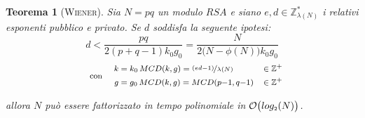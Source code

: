 \documentclass[twoside,symmetric,justified,openany,nobib]{tufte-book}
\def\P#1{_{\text{\tiny $#1$}}}
\newtheorem{thm}{Teorema}
\begin{document}
\begin{thm}[\textsc{Wiener}]
  \label{th-wiener}
  Sia $N{=}pq$ un modulo $RSA$ e siano $e,d{\in}\mathbb{Z}^*_{\lambda(N)}$ i relativi esponenti pubblico e privato. Se $d$ soddisfa la seguente ipotesi:
  \begin{equation}
    \label{ip_wiener}
    d < \frac{pq}{2(p{+}q{-}1)k_0g_0} = \frac{N}{2\bigl(N{-}\phi(N)\bigr)k_0g_0}
  \end{equation}
  \[
    \text{\footnotesize con}
    \hspace{12pt}{\footnotesize\begin{split}
      k &= k_0\,MCD(k,g) = \nicefrac{(ed{-}1)}{\lambda(N)} &\in \mathbb{Z}\textsuperscript{+}\\
      g &= g_0\,MCD(k,g) = MCD(p{-}1,q{-}1) &\in \mathbb{Z}\textsuperscript{+}\\
    \end{split}}
  \]

  \medskip
  \noindent
  allora $N$ può essere fattorizzato in tempo polinomiale in $\mathcal{O}\bigl(log\P{2}(N)\bigr)$.
\end{thm}
\end{document}
